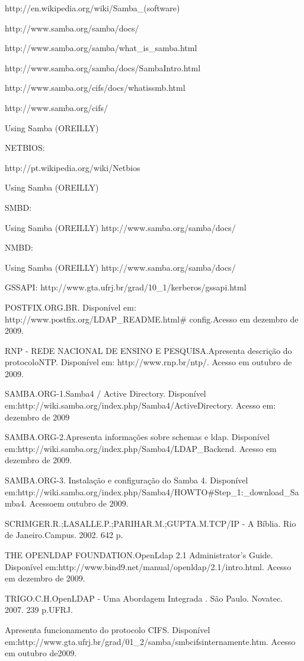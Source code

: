 http://en.wikipedia.org/wiki/Samba\_(software)

http://www.samba.org/samba/docs/

http://www.samba.org/samba/what\_is\_samba.html

http://www.samba.org/samba/docs/SambaIntro.html

http://www.samba.org/cifs/docs/what\-is\-smb.html

http://www.samba.org/cifs/

Using Samba (OREILLY)

NETBIOS:

http://pt.wikipedia.org/wiki/Netbios

Using Samba (OREILLY)

SMBD: 

Using Samba (OREILLY)
http://www.samba.org/samba/docs/

NMBD:

Using Samba (OREILLY)
http://www.samba.org/samba/docs/

GSSAPI:
http://www.gta.ufrj.br/grad/10\_1/kerberos/gssapi.html

POSTFIX.ORG.BR. Disponível em: http://www.postfix.org/LDAP\_README.html\# config.Acesso em dezembro de 2009.

RNP - REDE NACIONAL DE ENSINO E PESQUISA.Apresenta descrição do protocoloNTP. Disponível em: http://www.rnp.br/ntp/. Acesso em outubro de 2009.

SAMBA.ORG-1.Samba4 / Active Directory. Disponível em:http://wiki.samba.org/index.php/Samba4/ActiveDirectory. Acesso em: dezembro de 2009

SAMBA.ORG-2.Apresenta informações sobre schemas e ldap. Disponível em:http://wiki.samba.org/index.php/Samba4/LDAP\_Backend. Acesso em dezembro de 2009.

SAMBA.ORG-3. Instalação e configuração do Samba 4. Disponível em:http://wiki.samba.org/index.php/Samba4/HOWTO\#Step\_1:\_download\_Samba4. Acessoem outubro de 
2009.

SCRIMGER.R.;LASALLE.P.;PARIHAR.M.;GUPTA.M.TCP/IP - A Bíblia. Rio de Janeiro.Campus. 2002. 642 p.

THE OPENLDAP FOUNDATION.OpenLdap 2.1 Administrator's Guide. Disponível em:http://www.bind9.net/manual/openldap/2.1/intro.html. Acesso em dezembro de 2009.

TRIGO.C.H.OpenLDAP - Uma Abordagem Integrada
. São Paulo. Novatec. 2007. 239 p.UFRJ.

Apresenta funcionamento do protocolo CIFS. Disponível em:http://www.gta.ufrj.br/grad/01\_2/samba/smbcifsinternamente.htm. Acesso em outubro de2009.


